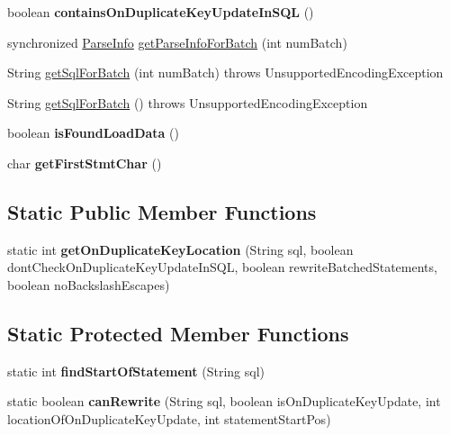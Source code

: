 \begin{DoxyCompactItemize}
boolean {\bfseries contains\+On\+Duplicate\+Key\+Update\+In\+S\+QL} ()
\item 
synchronized \mbox{\hyperlink{classcom_1_1mysql_1_1cj_1_1_parse_info}{Parse\+Info}} \mbox{\hyperlink{classcom_1_1mysql_1_1cj_1_1_parse_info_afb6755fef767af487192ea4a4f589d24}{get\+Parse\+Info\+For\+Batch}} (int num\+Batch)
\item 
String \mbox{\hyperlink{classcom_1_1mysql_1_1cj_1_1_parse_info_a7a1053a89e14ce278d2617ee0f56010f}{get\+Sql\+For\+Batch}} (int num\+Batch)  throws Unsupported\+Encoding\+Exception 
\item 
String \mbox{\hyperlink{classcom_1_1mysql_1_1cj_1_1_parse_info_a49a364ef5d8d3f1ac2ea98576601a926}{get\+Sql\+For\+Batch}} ()  throws Unsupported\+Encoding\+Exception 
\item 
\mbox{\label{classcom_1_1mysql_1_1cj_1_1_parse_info_a65f8d65a575cc6ad9497fbd55b5ee22e}} 
boolean {\bfseries is\+Found\+Load\+Data} ()
\item 
\mbox{\label{classcom_1_1mysql_1_1cj_1_1_parse_info_a29b231e147f11d1da6d1c5b40a2df776}} 
char {\bfseries get\+First\+Stmt\+Char} ()
\end{DoxyCompactItemize}
\subsection*{Static Public Member Functions}
\begin{DoxyCompactItemize}
\item 
\mbox{\label{classcom_1_1mysql_1_1cj_1_1_parse_info_a47b69a5028ecc28f00f72b62d95003f1}} 
static int {\bfseries get\+On\+Duplicate\+Key\+Location} (String sql, boolean dont\+Check\+On\+Duplicate\+Key\+Update\+In\+S\+QL, boolean rewrite\+Batched\+Statements, boolean no\+Backslash\+Escapes)
\end{DoxyCompactItemize}
\subsection*{Static Protected Member Functions}
\begin{DoxyCompactItemize}
\item 
\mbox{\label{classcom_1_1mysql_1_1cj_1_1_parse_info_aa47b9fbde39c657eac345e567ee07f72}} 
static int {\bfseries find\+Start\+Of\+Statement} (String sql)
\item 
\mbox{\label{classcom_1_1mysql_1_1cj_1_1_parse_info_adbc42f712587fec95fff129e59deeff7}} 
static boolean {\bfseries can\+Rewrite} (String sql, boolean is\+On\+Duplicate\+Key\+Update, int location\+Of\+On\+Duplicate\+Key\+Update, int statement\+Start\+Pos)
\end{DoxyCompactItemize}
